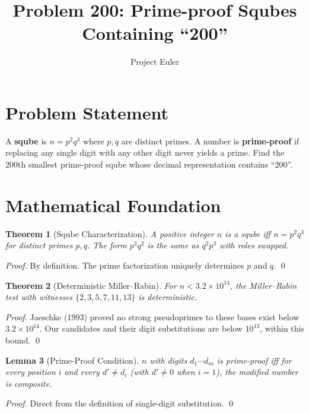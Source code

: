 \documentclass[12pt]{article}
\title{Problem 200: Prime-proof Squbes Containing ``200''}
\author{Project Euler}
\date{}
\newtheorem{theorem}{Theorem}
\newtheorem{lemma}[theorem]{Lemma}
\begin{document}
\maketitle

\section{Problem Statement}

A \textbf{sqube} is $n = p^2 q^3$ where $p, q$ are distinct primes. A number is \textbf{prime-proof} if replacing any single digit with any other digit never yields a prime. Find the 200th smallest prime-proof sqube whose decimal representation contains ``200''.

\section{Mathematical Foundation}

\begin{theorem}[Sqube Characterization]
A positive integer $n$ is a sqube iff $n = p^2 q^3$ for distinct primes $p, q$. The form $p^3 q^2$ is the same as $q^2 p^3$ with roles swapped.
\end{theorem}

\begin{proof}
By definition. The prime factorization uniquely determines $p$ and $q$. \qed
\end{proof}

\begin{theorem}[Deterministic Miller--Rabin]
For $n < 3.2 \times 10^{14}$, the Miller--Rabin test with witnesses $\{2, 3, 5, 7, 11, 13\}$ is deterministic.
\end{theorem}

\begin{proof}
Jaeschke (1993) proved no strong pseudoprimes to these bases exist below $3.2 \times 10^{14}$. Our candidates and their digit substitutions are below $10^{13}$, within this bound. \qed
\end{proof}

\begin{lemma}[Prime-Proof Condition]
$n$ with digits $d_1 \cdots d_m$ is prime-proof iff for every position $i$ and every $d' \neq d_i$ (with $d' \neq 0$ when $i = 1$), the modified number is composite.
\end{lemma}

\begin{proof}
Direct from the definition of single-digit substitution. \qed
\end{proof}
\end{document}
